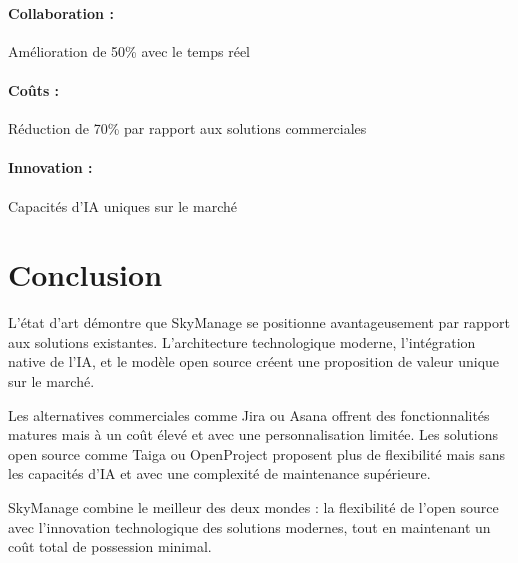 \paragraph{Collaboration :} Amélioration de 50\% avec le temps réel

\paragraph{Coûts :} Réduction de 70\% par rapport aux solutions commerciales

\paragraph{Innovation :} Capacités d'IA uniques sur le marché

\section{Conclusion}

L'état d'art démontre que SkyManage se positionne avantageusement par rapport aux solutions existantes. L'architecture technologique moderne, l'intégration native de l'IA, et le modèle open source créent une proposition de valeur unique sur le marché.

Les alternatives commerciales comme Jira ou Asana offrent des fonctionnalités matures mais à un coût élevé et avec une personnalisation limitée. Les solutions open source comme Taiga ou OpenProject proposent plus de flexibilité mais sans les capacités d'IA et avec une complexité de maintenance supérieure.

SkyManage combine le meilleur des deux mondes : la flexibilité de l'open source avec l'innovation technologique des solutions modernes, tout en maintenant un coût total de possession minimal.
